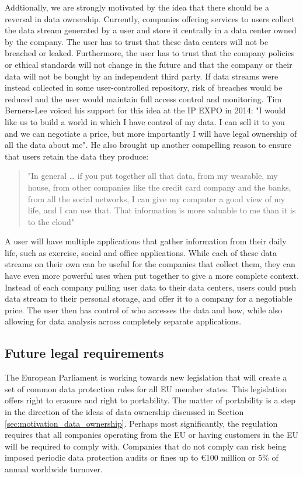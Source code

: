 Addtionally, we are strongly motivated by the idea that there should be a reversal in data ownership. Currently, companies offering services to users collect the data stream generated by a user and store it centrally in a data center owned by the company. The user has to trust that these data centers will not be breached or leaked. Furthermore, the user has to trust that the company policies or ethical standards will not change in the future and that the company or their data will not be bought by an independent third party. If data streams were instead collected in some user-controlled repository, risk of breaches would be reduced and the user would maintain full access control and monitoring. Tim Berners-Lee voiced his support for this idea at the IP EXPO in 2014: "I would like us to build a world in which I have control of my data. I can sell it to you and we can negotiate a price, but more importantly I will have legal ownership of all the data about me"\citep{bernerslee2014dataownershiptelegraph}. He also brought up another compelling reason to ensure that users retain the data they produce: \begin{quote}
	"In general … if you put together all that data, from my wearable, my house, from other companies like the credit card company and the banks, from all the social networks, I can give my computer a good view of my life, and I can use that. That information is more valuable to me than it is to the cloud" \citep{bernerslee2014dataownershipguardian}
\end{quote} A user will have multiple applications that gather information from their daily life, such as exercise, social and office applications. While each of these data streams on their own can be useful for the companies that collect them, they can have even more powerful uses when put together to give a more complete context. Instead of each company pulling user data to their data centers, users could push data stream to their personal storage, and offer it to a company for a negotiable price. The user then has control of who accesses the data and how, while also allowing for data analysis across completely separate applications.

\subsection{Future legal requirements}

The European Parliament is working towards new legislation that will create a set of common data protection rules for all EU member states\citep{eudata2013newlegislation}. This legislation offers right to erasure and right to portability. The matter of portability is a step in the direction of the ideas of data ownership discussed in Section \ref{sec:motivation_data_ownership}.  Perhaps most significantly, the regulation requires that all companies operating from the EU or having customers in the EU will be required to comply with. Companies that do not comply can risk being imposed periodic data protection audits or fines up to €100 million or 5\% of annual worldwide turnover.

